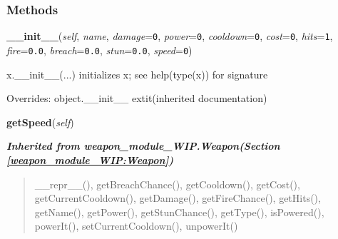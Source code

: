 
  \subsubsection{Methods}

    \vspace{0.5ex}

\hspace{.8\funcindent}\begin{boxedminipage}{\funcwidth}

    \raggedright \textbf{\_\_init\_\_}(\textit{self}, \textit{name}, \textit{damage}={\tt 0}, \textit{power}={\tt 0}, \textit{cooldown}={\tt 0}, \textit{cost}={\tt 0}, \textit{hits}={\tt 1}, \textit{fire}={\tt 0.0}, \textit{breach}={\tt 0.0}, \textit{stun}={\tt 0.0}, \textit{speed}={\tt 0})

\setlength{\parskip}{2ex}
    x.\_\_init\_\_(...) initializes x; see help(type(x)) for signature

\setlength{\parskip}{1ex}
      Overrides: object.\_\_init\_\_ 	extit{(inherited documentation)}

    \end{boxedminipage}

    \label{weapon_module_WIP:Laser:getSpeed}

    \vspace{0.5ex}

\hspace{.8\funcindent}\begin{boxedminipage}{\funcwidth}

    \raggedright \textbf{getSpeed}(\textit{self})

\setlength{\parskip}{2ex}
\setlength{\parskip}{1ex}
    \end{boxedminipage}


\large{\textbf{\textit{Inherited from weapon\_module\_WIP.Weapon\textit{(Section \ref{weapon_module_WIP:Weapon})}}}}

\begin{quote}
\_\_repr\_\_(), getBreachChance(), getCooldown(), getCost(), getCurrentCooldown(), getDamage(), getFireChance(), getHits(), getName(), getPower(), getStunChance(), getType(), isPowered(), powerIt(), setCurrentCooldown(), unpowerIt()
\end{quote}

